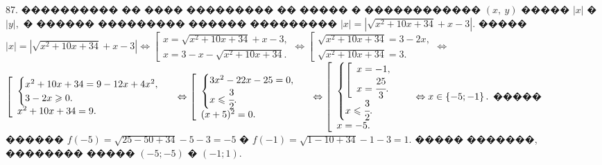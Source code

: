 \documentclass[12pt]{article}
\begin{document}
87. ���������� �� ���� ��������� �� ����� � ������������ $(x,\ y)$ ����� $|x|$ � $|y|,$ � ������ ��������� ������ ��������� $|x|=|\sqrt{x^2+10x+34}+x-3|.$ ����� $|x|=|\sqrt{x^2+10x+34}+x-3|\Leftrightarrow \left[\begin{array}{l} x=\sqrt{x^2+10x+34}+x-3,\\ x=3-x-\sqrt{x^2+10x+34}.\end{array}\right.\Leftrightarrow \left[\begin{array}{l} \sqrt{x^2+10x+34}=3-2x,\\ \sqrt{x^2+10x+34}=3.\end{array}\right.\Leftrightarrow$\\$ \left[\begin{array}{l} \begin{cases} x^2+10x+34=9-12x+4x^2,\\ 3-2x\geqslant0.\end{cases}\\ x^2+10x+34=9.\end{array}\right.\Leftrightarrow \left[\begin{array}{l} \begin{cases} 3x^2-22x-25=0,\\ x\leqslant\cfrac{3}{2}.\end{cases}\\ (x+5)^2=0.\end{array}\right.\Leftrightarrow \left[\begin{array}{l} \begin{cases} \left[\begin{array}{l} x=-1,\\ x=\cfrac{25}{3}.\end{array}\right.\\ x\leqslant\cfrac{3}{2}.\end{cases}\\ x=-5.\end{array}\right.\Leftrightarrow x\in\left\{-5;-1\right\}.$
����� ������ $f(-5)=\sqrt{25-50+34}-5-3=-5$ � $f\left(-1\right)=\sqrt{1-10+34}-1-3=1.$
����� �������, �������� ����� $(-5; -5)$ � $\left(-1;1\right).$\\
\end{document}
